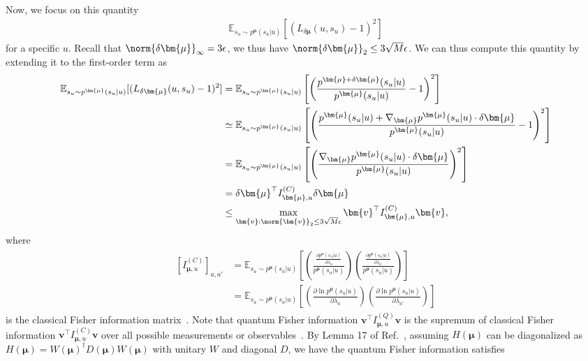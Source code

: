 \documentclass[twocolumn,superscriptaddress,aps,showpacs,amsmath,amstex,amssymb,citeautoscript,floatfix,pra,preprintnumbers]{revtex4-2}
\theoremstyle{plain}
\theoremstyle{plain}
\theoremstyle{plain}
\theoremstyle{plain}
\theoremstyle{plain}
\theoremstyle{plain}
\begin{document}
\begin{appendix}
Now, we focus on this quantity
\begin{align}
\mathbb{E}_{s_u\sim p^{\bm{\mu}}(s_u|u)}[(L_{\delta\bm{\mu}}(u,s_u)-1)^2]
\end{align}
for a specific $u$. Recall that $\norm{\delta\bm{\mu}}_{\infty}=3\epsilon$, we thus have $\norm{\delta\bm{\mu}}_2\leq 3\sqrt{M}\epsilon$. We can thus compute this quantity by extending it to the first-order term as
\begin{align}
\begin{split}
\mathbb{E}_{s_u\sim p^{\bm{\mu}}(s_u|u)}[(L_{\delta\bm{\mu}}(u,s_u)-1)^2]&=\mathbb{E}_{s_u\sim p^{\bm{\mu}}(s_u|u)}\left[\left(\frac{p^{\bm{\mu}+\delta\bm{\mu}}(s_u|u)}{p^{\bm{\mu}}(s_u|u)}-1\right)^2\right]\\
&\simeq\mathbb{E}_{s_u\sim p^{\bm{\mu}}(s_u|u)}\left[\left(\frac{p^{\bm{\mu}}(s_u|u)+\nabla_{\bm{\mu}}p^{\bm{\mu}}(s_u|u)\cdot\delta\bm{\mu}}{p^{\bm{\mu}}(s_u|u)}-1\right)^2\right]\\
&=\mathbb{E}_{s_u\sim p^{\bm{\mu}}(s_u|u)}\left[\left(\frac{\nabla_{\bm{\mu}}p^{\bm{\mu}}(s_u|u)\cdot\delta\bm{\mu}}{p^{\bm{\mu}}(s_u|u)}\right)^2\right]\\
&=\delta\bm{\mu}^{\top}I^{(C)}_{\bm{\mu},u}\delta\bm{\mu}\\
&\leq\max_{\bm{v}:\norm{\bm{v}}_2\leq 3\sqrt{M}\epsilon}\bm{v}^\top I^{(C)}_{\bm{\mu},u}\bm{v},
\end{split}
\end{align}
where 
\begin{align}
\begin{split}
\left[I_{\bm{\mu},u}^{(C)}\right]_{a,a'}&=\mathbb{E}_{s_u\sim p^{\bm{\mu}}(s_u|u)}\left[\left(\frac{\frac{\partial p^{\bm{\mu}}(s_u|u)}{\partial\lambda_a}}{p^{\bm{\mu}}(s_u|u)}\right)\left(\frac{\frac{\partial p^{\bm{\mu}}(s_u|u)}{\partial\lambda_{a'}}}{p^{\bm{\mu}}(s_u|u)}\right)\right]\\
&=\mathbb{E}_{s_u\sim p^{{\bm{\mu}}}(s_u|u)}\left[\left(\frac{\partial \ln p^{\bm{\mu}}(s_u|u)}{\partial\lambda_a}\right)\left(\frac{\partial \ln p^{\bm{\mu}}(s_u|u)}{\partial\lambda_{a'}}\right)\right]
\end{split}
\end{align}
is the classical Fisher information matrix~\cite{PhysRevD.23.357,PhysRevLett.72.3439,BRAUNSTEIN1996135}. Note that quantum Fisher information $\bm{v}^{\top}I^{(Q)}_{{\bm{\mu}},u}\bm{v}$ is the supremum of classical Fisher information $\bm{v}^{\top}I^{(C)}_{{\bm{\mu}},u}\bm{v}$ over all possible measurements or observables~\cite{Paris2009Quantum}. By Lemma 17 of Ref.~\cite{dutkiewicz2024advantage}, assuming $H({\bm{\mu}})$ can be diagonalized as $H({\bm{\mu}})=W({\bm{\mu}})^\dagger D({\bm{\mu}}) W({\bm{\mu}})$ with unitary $W$ and diagonal $D$, we have the quantum Fisher information satisfies

\end{appendix}
\end{document}
